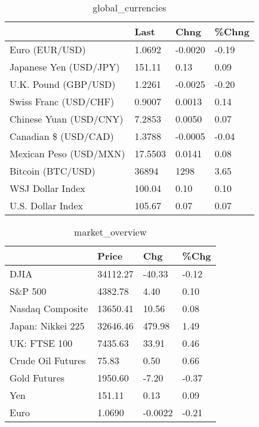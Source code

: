 \documentclass{article}%
\begin{document}
%


\begin{table}[htbp]%
\caption{global\_currencies}%
\centering%
\begin{adjustbox}{width=1\textwidth}%
\begin{tabular}{llll}
\toprule
                       &    Last &    Chng & \%Chng \\
\midrule
        Euro (EUR/USD) &  1.0692 & -0.0020 & -0.19 \\
Japanese Yen (USD/JPY) &  151.11 &    0.13 &  0.09 \\
  U.K. Pound (GBP/USD) &  1.2261 & -0.0025 & -0.20 \\
 Swiss Franc (USD/CHF) &  0.9007 &  0.0013 &  0.14 \\
Chinese Yuan (USD/CNY) &  7.2853 &  0.0050 &  0.07 \\
  Canadian \$ (USD/CAD) &  1.3788 & -0.0005 & -0.04 \\
Mexican Peso (USD/MXN) & 17.5503 &  0.0141 &  0.08 \\
     Bitcoin (BTC/USD) &   36894 &    1298 &  3.65 \\
      WSJ Dollar Index &  100.04 &    0.10 &  0.10 \\
     U.S. Dollar Index &  105.67 &    0.07 &  0.07 \\
\bottomrule
\end{tabular}
%
\end{adjustbox}%
\end{table}

%


\begin{table}[htbp]%
\caption{market\_overview}%
\centering%
\begin{adjustbox}{width=1\textwidth}%
\begin{tabular}{llll}
\toprule
                  &    Price &     Chg &  \%Chg \\
\midrule
             DJIA & 34112.27 &  -40.33 & -0.12 \\
          S\&P 500 &  4382.78 &    4.40 &  0.10 \\
 Nasdaq Composite & 13650.41 &   10.56 &  0.08 \\
Japan: Nikkei 225 & 32646.46 &  479.98 &  1.49 \\
     UK: FTSE 100 &  7435.63 &   33.91 &  0.46 \\
Crude Oil Futures &    75.83 &    0.50 &  0.66 \\
     Gold Futures &  1950.60 &   -7.20 & -0.37 \\
              Yen &   151.11 &    0.13 &  0.09 \\
             Euro &   1.0690 & -0.0022 & -0.21 \\
\bottomrule
\end{tabular}
%
\end{adjustbox}%
\end{table}

%
\end{document}
